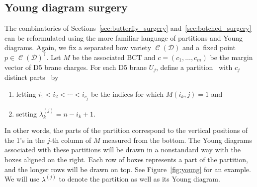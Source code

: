 \documentclass[11pt]{article}
\numberwithin{equation}{section}
\newcommand{\brane}{\mathcal D}
\newcommand{\torus}{\mathbb T}
\DeclareMathOperator{\bowvar}{\mathcal C}
\begin{document}
\subsection{Young diagram surgery}
The combinatorics of Sections~\ref{sec:butterfly_surgery} and~\ref{sec:botched_surgery} can be reformulated using the more familiar language of partitions and Young diagrams. Again, we fix a separated bow variety $\bowvar(\brane)$ and a~fixed point~${p\in \bowvar(\brane)^\torus}$. Let $M$ be the associated BCT and $c=(c_1, \dots , c_m)$ be the margin vector of D5 brane charges. For each D5 brane $U_j$, define a partition~ with $c_j$ distinct parts~ by
\begin{enumerate}\itemsep=0pt
\item[(1)] letting $i_1 < i_2 < \cdots < i_{c_j}$ be the indices for which $M(i_k, j) = 1$ and
\item[(2)] setting $\lambda^{(j)}_k = n - i_k + 1$.
\end{enumerate}
In other words, the parts of the partition correspond to the vertical positions of the 1's in the $j$-th column of $M$ measured from the bottom. The Young diagrams associated with these partitions will be drawn in a nonstandard way with the boxes aligned on the right. Each row of boxes represents a part of the partition, and the longer rows will be drawn on top. See Figure~\ref{fig:young} for an example. We will use $\lambda^{(j)}$ to denote the partition as well as its Young diagram.
\end{document}
